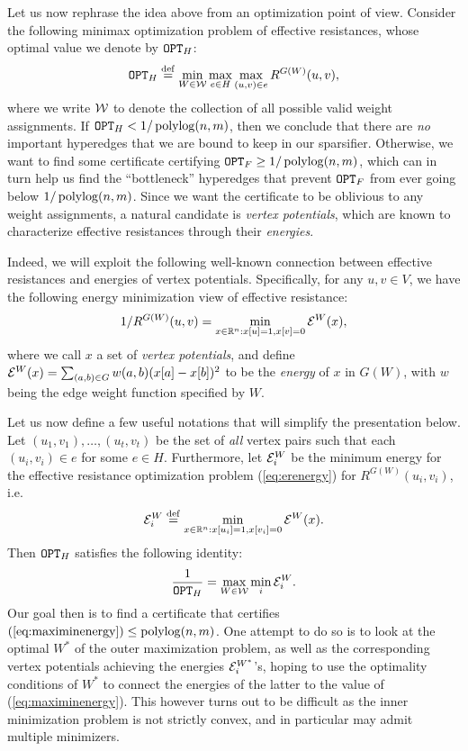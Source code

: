 \documentclass{article}
\begin{document}
Let us now rephrase the idea above from an optimization point of view.
Consider the following minimax optimization problem of effective resistances,
whose optimal value we denote by $\mathtt{OPT}_H$:
\begin{align}\label{eq:minimaxer}
    \mathtt{OPT}_H \stackrel{\mathrm{def}}{=} \min_{W\in \mathcal{W}} \max_{e\in H} \max_{(u,v)\in e}
    R^{G(W)} (u,v),
\end{align}
where we write $\mathcal{W}$ to denote the collection of all possible valid weight assignments.
If $\mathtt{OPT}_H < 1/\operatorname{polylog}(n,m)$, then we conclude that
there are \textit{no} important hyperedges that we are bound to keep in our sparsifier.
Otherwise,
we want to find some certificate certifying $\mathtt{OPT}_F \geq 1/\operatorname{polylog}(n,m)$,
which can in turn help us find the ``bottleneck'' hyperedges that prevent
$\mathtt{OPT}_F$ from ever going below $1/\operatorname{polylog}(n,m)$.
Since we want the certificate to be oblivious to any weight assignments,
a natural candidate is \textit{vertex potentials}, which are known
to characterize effective resistances through their \textit{energies}.

Indeed, we will exploit the following well-known connection between
effective resistances and energies of vertex potentials.
Specifically, for any $u,v\in V$, we have the following energy minimization
view of effective resistance:
\begin{align}\label{eq:erenergy}
    1/R^{G(W)}(u,v) =
    \min_{x\in\mathbb{R}^{n}: x[u]=1,x[v]=0}
    \mathcal{E}^{W}(x),
\end{align}
where we call $x$ a set of \textit{vertex potentials},
and define $\mathcal{E}^{W}(x) = \sum_{(a,b)\in G} w(a,b) (x[a] - x[b])^2$ to be the
\textit{energy} of $x$ in $G(W)$, with $w$ being the edge weight function specified by $W$.

Let us now define a few useful notations that will simplify the presentation below.
Let
$(u_1,v_1),\ldots,(u_t,v_t)$ be the set of \textit{all} vertex pairs such that
each $(u_i,v_i)\in e$ for some $e\in H$.
Furthermore, let $\mathcal{E}_i^{W}$ be the minimum energy for the effective resistance
optimization problem (\ref{eq:erenergy}) for $R^{G(W)}(u_i,v_i)$, i.e.
\begin{align*}
    \mathcal{E}_i^{W} \stackrel{\mathrm{def}}{=} \min_{x\in\mathbb{R}^{n}: x[u_i]=1,x[v_i]=0}
    \mathcal{E}^{W}(x).
\end{align*}
Then $\mathtt{OPT}_H$ satisfies the following
identity:
\begin{align}\label{eq:maximinenergy}
    \frac{1}{\mathtt{OPT}_H} =
    \max_{W\in \mathcal{W}}
    \min_{i} \mathcal{E}^{W}_i.
\end{align}
Our goal then is to find a certificate that certifies
$(\ref{eq:maximinenergy})\leq \operatorname{polylog}(n,m)$.
One attempt to do so is to look at the
optimal $W^*$ of the outer maximization problem,
as well as the corresponding vertex potentials achieving the energies
$\mathcal{E}_i^{W^*}$'s, hoping to use the optimality conditions of $W^*$ to connect
the energies of the latter to the value of (\ref{eq:maximinenergy}).
This however turns out to be difficult as
the inner minimization problem is not strictly convex, and in particular may
admit multiple minimizers.
\end{document}

